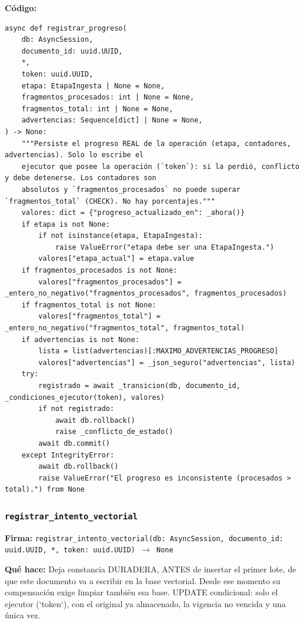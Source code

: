 \documentclass[11pt,a4paper]{article}
\begin{document}
\textbf{Código:}
\begin{lstlisting}
async def registrar_progreso(
    db: AsyncSession,
    documento_id: uuid.UUID,
    *,
    token: uuid.UUID,
    etapa: EtapaIngesta | None = None,
    fragmentos_procesados: int | None = None,
    fragmentos_total: int | None = None,
    advertencias: Sequence[dict] | None = None,
) -> None:
    """Persiste el progreso REAL de la operación (etapa, contadores, advertencias). Solo lo escribe el
    ejecutor que posee la operación (`token`): si la perdió, conflicto y debe detenerse. Los contadores son
    absolutos y `fragmentos_procesados` no puede superar `fragmentos_total` (CHECK). No hay porcentajes."""
    valores: dict = {"progreso_actualizado_en": _ahora()}
    if etapa is not None:
        if not isinstance(etapa, EtapaIngesta):
            raise ValueError("etapa debe ser una EtapaIngesta.")
        valores["etapa_actual"] = etapa.value
    if fragmentos_procesados is not None:
        valores["fragmentos_procesados"] = _entero_no_negativo("fragmentos_procesados", fragmentos_procesados)
    if fragmentos_total is not None:
        valores["fragmentos_total"] = _entero_no_negativo("fragmentos_total", fragmentos_total)
    if advertencias is not None:
        lista = list(advertencias)[:MAXIMO_ADVERTENCIAS_PROGRESO]
        valores["advertencias"] = _json_seguro("advertencias", lista)
    try:
        registrado = await _transicion(db, documento_id, _condiciones_ejecutor(token), valores)
        if not registrado:
            await db.rollback()
            raise _conflicto_de_estado()
        await db.commit()
    except IntegrityError:
        await db.rollback()
        raise ValueError("El progreso es inconsistente (procesados > total).") from None
\end{lstlisting}

\subsubsection*{\texttt{registrar\_intento\_vectorial}}
\textbf{Firma:} \texttt{registrar\_intento\_vectorial(db: AsyncSession, documento\_id: uuid.UUID, *, token: uuid.UUID) $\rightarrow$ None}

\textbf{Qué hace:} Deja constancia DURADERA, ANTES de insertar el primer lote, de que este documento va a escribir en
la base vectorial. Desde ese momento su compensación exige limpiar también esa base. UPDATE condicional:
solo el ejecutor (`token`), con el original ya almacenado, la vigencia no vencida y una única vez.
\end{document}
